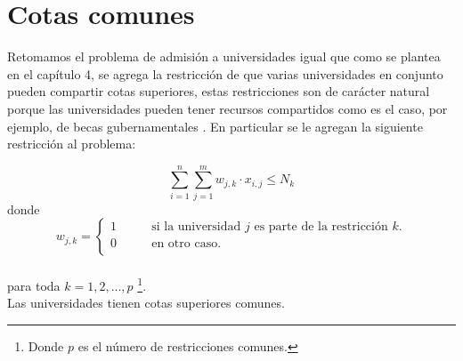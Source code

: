 \chapter{Cotas comunes}

Retomamos el problema de admisión a universidades igual que como se plantea en el capítulo 4, se agrega la restricción de que varias universidades en conjunto pueden compartir cotas superiores, estas restricciones son de carácter natural porque las universidades pueden tener recursos compartidos como es el caso, por ejemplo, de becas gubernamentales . En particular se le agregan la siguiente restricción al problema:


\begin{equation}
\sum_{i=1}^{n} \sum_{j=1}^m w_{j,k} \cdot x_{i,j} \leq N_k %
\end{equation} 
donde \begin{equation} w_{j,k}= 
\begin{cases}
1 & \qquad \text{si la universidad $j$ es parte de la restricción $k$.} \\
0 &\qquad\text{en otro caso.} \\ 
\end{cases} \end{equation} \\ para toda $k=1,2,\dots,p$ \footnote{Donde $p$ es el número de restricciones comunes.}. \\
Las universidades tienen cotas superiores comunes.




